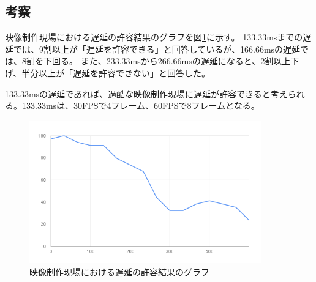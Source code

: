 \subsection{考察}

映像制作現場における遅延の許容結果のグラフを図\ref{fig:mv-delay-result-graph}に示す。
133.33msまでの遅延では、9割以上が「遅延を許容できる」と回答しているが、166.66msの遅延では、8割を下回る。
また、233.33msから266.66msの遅延になると、2割以上下げ、半分以上が「遅延を許容できない」と回答した。

133.33msの遅延であれば、過酷な映像制作現場に遅延が許容できると考えられる。133.33msは、30FPSで4フレーム、60FPSで8フレームとなる。

\begin{figure}[htbp]
  \begin{center}
    \includegraphics[bb=0 0 600 371,width=10cm]{img/mv-delay-result-graph.png}
  \end{center}
  \caption{映像制作現場における遅延の許容結果のグラフ}
  \label{fig:mv-delay-result-graph}
\end{figure}


%
%
%
%
%
%
%
%

